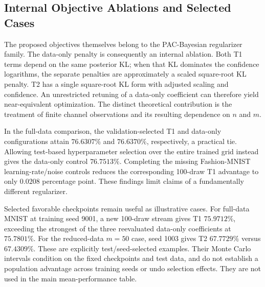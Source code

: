 \subsection{Internal Objective Ablations and Selected Cases}
The proposed objectives themselves belong to the PAC-Bayesian regularizer
family. The data-only penalty is consequently an internal ablation. Both
T1 terms depend on the same posterior KL; when that KL dominates the
confidence logarithms, the separate penalties are approximately a scaled
square-root KL penalty. T2 has a single square-root KL form with adjusted
scaling and confidence. An unrestricted retuning of a data-only
coefficient can therefore yield near-equivalent optimization. The
distinct theoretical contribution is the treatment of finite channel
observations and its resulting dependence on $n$ and $m$.

In the full-data comparison, the validation-selected T1 and data-only
configurations attain $76.6307\%$ and $76.6370\%$, respectively, a
practical tie. Allowing test-based hyperparameter selection over the
entire trained grid instead gives the data-only control $76.7513\%$.
Completing the missing Fashion-MNIST learning-rate/noise controls reduces
the corresponding 100-draw T1 advantage to only $0.0208$ percentage point.
These findings limit claims of a fundamentally different regularizer.

Selected favorable checkpoints remain useful as illustrative cases. For
full-data MNIST at training seed 9001, a new 100-draw stream gives T1
$75.9712\%$, exceeding the strongest of the three reevaluated data-only
coefficients at $75.7801\%$. For the reduced-data $m=50$ case, seed 1003
gives T2 $67.7729\%$ versus $67.4309\%$. These are explicitly
test/seed-selected examples. Their Monte Carlo intervals condition on
the fixed checkpoints and test data, and do not establish a population
advantage across training seeds or undo selection effects. They are not
used in the main mean-performance table.

